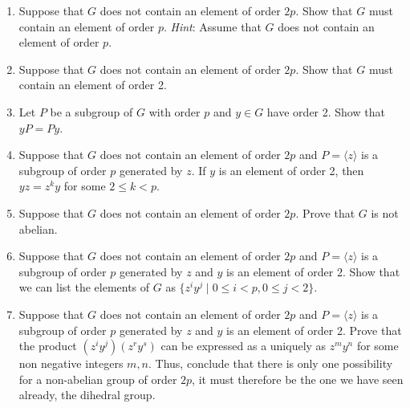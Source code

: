 {\begin{enumerate}
\begin{enumerate}
\item
Suppose that $G$ does not contain an element of order $2p$.  Show that $G$ must contain an element of order $p$.  {\em Hint}:  Assume that $G$ does not contain an element of order $p$.



\item
Suppose that $G$ does not contain an element of order $2p$.  Show that $G$ must contain an element of order 2. 



\item
Let $P$ be a subgroup of $G$ with order $p$ and $y \in G$ have order 2.  Show that $yP = Py$.



\item
Suppose that $G$ does not contain an element of order $2p$ and $P = \langle z \rangle$ is a subgroup of order $p$ generated by $z$.  If $y$ is an element of order 2, then $yz = z^ky$ for some $2 \leq k < p$.



\item
Suppose that $G$ does not contain an element of order $2p$.  Prove that $G$ is not abelian.



\item
Suppose that $G$ does not contain an element of order $2p$ and $P = \langle z \rangle$ is a subgroup of order $p$ generated by $z$ and $y$ is an element of order 2.
Show that we can list the elements of $G$ as $\{z^iy^j\mid 0\leq i<p, 0\leq j < 2\}$.



\item
Suppose that $G$ does not contain an element of order $2p$ and $P = \langle z \rangle$ is a subgroup of order $p$ generated by $z$ and $y$ is an element of order 2.  Prove that the product
$(z^iy^j)(z^ry^s)$ can be expressed as a uniquely as $z^m y^n$ for some non negative integers $m, n$.  Thus, conclude that there is only one possibility for a non-abelian group of order $2p$, it must therefore be the one we have seen already, the dihedral group.



 
\end{enumerate}

 
\end{enumerate}
}

\sagesection




